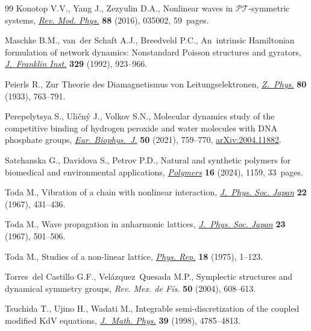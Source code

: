 \documentclass[pdftex]{sigma}
\numberwithin{equation}{section}
\begin{document}
\begin{thebibliography}{99}
Konotop V.V., Yang J., Zezyulin D.A., Nonlinear waves in
 $\mathcal{PT}$-symmetric systems,
 \href{https://doi.org/10.1103/RevModPhys.88.035002}{\textit{Rev. Mod. Phys.}}
 \textbf{88} (2016), 035002, 59~pages.

Maschke B.M., van~der Schaft A.J., Breedveld P.C., An~intrinsic {H}amiltonian
 formulation of network dynamics: {N}onstandard {P}oisson structures and
 gyrators,
 \href{https://doi.org/10.1016/S0016-0032(92)90049-M}{\textit{J.~Franklin
 Inst.}} \textbf{329} (1992), 923--966.

Peierls R., Zur {T}heorie des {D}iamagnetismus von {L}eitungselektronen,
 \href{https://doi.org/10.1007/BF01342591}{\textit{Z.~Phys.}} \textbf{80}
 (1933), 763--791.

Perepelytsya S., Uli\v{c}n\'y J., Volkov S.N., Molecular dynamics study of the
 competitive binding of hydrogen peroxide and water molecules with {DNA}
 phosphate groups,
 \href{https://doi.org/10.1007/s00249-021-01522-8}{\textit{Eur. Biophys.~J.}}
 \textbf{50} (2021), 759--770,
 \href{http://arxiv.org/abs/2004.11882}{arXiv:2004.11882}.

Satchanska G., Davidova S., Petrov P.D., Natural and synthetic polymers for
 biomedical and environmental applications,
 \href{https://doi.org/10.3390/polym16081159}{\textit{Polymers}} \textbf{16}
 (2024), 1159, 33~pages.

Toda M., Vibration of a chain with nonlinear interaction,
 \href{https://doi.org/10.1143/JPSJ.22.431}{\textit{J.~Phys. Soc. Japan}}
 \textbf{22} (1967), 431--436.

Toda M., Wave propagation in anharmonic lattices,
 \href{https://doi.org/10.1143/JPSJ.23.501}{\textit{J.~Phys. Soc. Japan}}
 \textbf{23} (1967), 501--506.

Toda M., Studies of a non-linear lattice,
 \href{https://doi.org/10.1016/0370-1573(75)90018-6}{\textit{Phys. Rep.}}
 \textbf{18} (1975), 1--123.


Torres~del Castillo G.F., Vel\'azquez~Quesada M.P., Symplectic structures and
 dynamical symmetry groups, \textit{Rev. Mex. de F\'is.} \textbf{50} (2004),
 608--613.

Tsuchida T., Ujino H., Wadati M., Integrable semi-discretization of the coupled
 modified {K}d{V} equations,
 \href{https://doi.org/10.1063/1.532537}{\textit{J.~Math. Phys.}} \textbf{39}
 (1998), 4785--4813.


\end{thebibliography}
\end{document}
